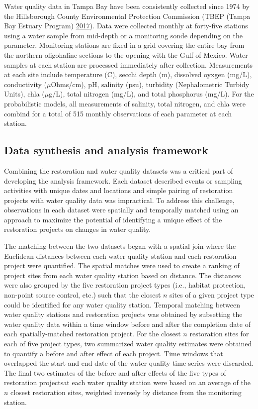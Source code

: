 \documentclass[]{article}
\begin{document}
Water quality data in Tampa Bay have been consistently collected since
1974 by the Hillsborough County Environmental Protection Commission
(TBEP (Tampa Bay Estuary Program) \protect\hyperlink{ref-TBEP17}{2017}).
Data were collected monthly at forty-five stations using a water sample
from mid-depth or a monitoring sonde depending on the parameter.
Monitoring stations are fixed in a grid covering the entire bay from the
northern oligohaline sections to the opening with the Gulf of Mexico.
Water samples at each station are processed immediately after
collection. Measurements at each site include temperature (C), secchi
depth (m), dissolved oyxgen (mg/L), conductivity (\(\mu\)Ohms/cm), pH,
salinity (psu), turbidity (Nephalometric Turbidy Units), \ac{chla}
(\(\mu\)g/L), total nitrogen (mg/L), and total phosphorus (mg/L). For
the probabilistic models, all measurements of salinity, total nitrogen,
and \ac{chla} were combind for a total of 515 monthly observations of
each parameter at each station.

\subsection{Data synthesis and analysis
framework}\label{data-synthesis-and-analysis-framework}

Combining the restoration and water quality datasets was a critical part
of developing the analysis framework. Each dataset described events or
sampling activities with unique dates and locations and simple pairing
of restoration projects with water quality data was impractical. To
address this challenge, observations in each dataset were spatially and
temporally matched using an approach to maximize the potential of
identifying a unique effect of the restoration projects on changes in
water quality.

The matching between the two datasets began with a spatial join where
the Euclidean distances between each water quality station and each
restoration project were quantified. The spatial matches were used to
create a ranking of project sites from each water quality station based
on distance. The distances were also grouped by the five restoration
project types (i.e., habitat protection, non-point source control, etc.)
such that the closest \(n\) sites of a given project type could be
identified for any water quality station. Temporal matching between
water quality stations and restoration projects was obtained by
subsetting the water quality data within a time window before and after
the completion date of each spatially-matched restoration project. For
the closest \(n\) restoration sites for each of five project types, two
summarized water quality estimates were obtained to quantify a before
and after effect of each project. Time windows that overlapped the start
and end date of the water quality time series were discarded. The final
two estimates of the before and after effects of the five types of
restoration projectsat each water quality station were based on an
average of the \(n\) closest restoration sites, weighted inversely by
distance from the monitoring station.
\end{document}

